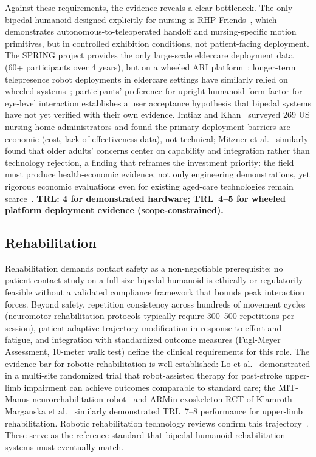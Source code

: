 \documentclass[acmsmall]{acmart}
\begin{document}
Against these requirements, the evidence reveals a clear bottleneck. The only
bipedal humanoid designed explicitly for nursing is RHP
Friends~\cite{benallegue2025rhp}, which demonstrates autonomous-to-teleoperated
handoff and nursing-specific motion primitives, but in controlled exhibition
conditions, not patient-facing deployment. The SPRING project provides the only
large-scale eldercare deployment data (60+ participants over 4 years), but on a
wheeled ARI platform~\cite{alamedapineda2024spring}; longer-term telepresence
robot deployments in eldercare settings have similarly relied on wheeled
systems~\cite{cesta2016amicare}; participants' preference for
upright humanoid form factor for eye-level interaction establishes a user
acceptance hypothesis that bipedal systems have not yet verified with their own
evidence. Imtiaz and Khan~\cite{imtiaz2024perceptions} surveyed 269 US nursing
home administrators and found the primary deployment barriers are economic
(cost, lack of effectiveness data), not technical; Mitzner et
al.~\cite{mitzner2018technology} similarly found that older adults' concerns
center on capability and integration rather than technology rejection, a finding
that reframes the investment priority: the field must produce health-economic
evidence, not only engineering demonstrations, yet rigorous economic evaluations
even for existing aged-care technologies remain
scarce~\cite{bulamu2018economic}. \textbf{TRL: 4 for demonstrated hardware;
TRL~4--5 for wheeled platform deployment evidence (scope-constrained).}

\subsection{Rehabilitation}
\label{sec:rehabilitation}

Rehabilitation demands contact safety as a non-negotiable prerequisite: no
patient-contact study on a full-size bipedal humanoid is ethically or
regulatorily feasible without a validated compliance framework that bounds peak
interaction forces. Beyond safety, repetition consistency across hundreds of
movement cycles (neuromotor rehabilitation protocols typically require 300--500
repetitions per session), patient-adaptive trajectory modification in response to
effort and fatigue, and integration with standardized outcome measures
(Fugl-Meyer Assessment, 10-meter walk test) define the clinical requirements for
this role. The evidence bar for robotic rehabilitation is well established:
Lo et al.~\cite{lo2010robot} demonstrated in a multi-site randomized trial that
robot-assisted therapy for post-stroke upper-limb impairment can achieve
outcomes comparable to standard care; the MIT-Manus neurorehabilitation
robot~\cite{krebs1998robot} and ARMin exoskeleton RCT of
Klamroth-Marganska et al.~\cite{klamroth2014armin} similarly demonstrated
TRL~7--8 performance for upper-limb rehabilitation. Robotic rehabilitation
technology reviews confirm this trajectory~\cite{poli2013robotic}. These serve
as the reference standard that bipedal humanoid rehabilitation systems must
eventually match.
\end{document}

